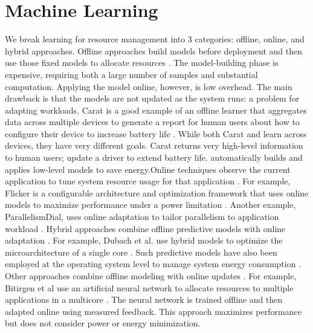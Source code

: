 \section{Machine Learning}
We break learning for resource management into 3 categories: offline,
online, and hybrid approaches. Offline  approaches build models
before deployment and then use those fixed models to allocate
resources
\cite{Yi2003,LeeBrooks2006,CPR,ChenJohn2011,petabricksStatic}.  The
model-building phase is expensive, requiring both a large number of
samples and substantial computation.  Applying the model online,
however, is low overhead.  The main drawback is that the models are
not updated as the system runs: a problem for adapting workloads.
  Carat is a good example of an
offline learner that aggregates data across multiple devices to
generate a report for human users about how to configure their device
to increase battery life \cite{carat}.  While both Carat and \SYSTEM{}
learn across devices, they have very different goals.  Carat returns
very high-level information to human users; \eg{} update a driver to
extend battery life.  \SYSTEM{} automatically builds and applies
low-level models to save energy.Online techniques observe the current application
to tune system resource usage for that application
\cite{Li2006,Flicker,ParallelismDial,Ponamarev,petabricksDynamic,LeeBrooks}.
For example, Flicker is a configurable architecture and optimization
framework that uses online models to maximize performance under a
power limitation \cite{Flicker}.  Another example, ParallelismDial,
uses online adaptation to tailor parallelism to application workload
\cite{ParallelismDial}. Hybrid  approaches combine offline
predictive models with online adaptation
\cite{Zhang2012,packandcap,Winter2010,dubach2010,Koala,Cinder,
  wu2012inferred}.  For example, Dubach et al.  use hybrid models to
optimize the microarchitecture of a single core \cite{dubach2010}.
Such predictive models have also been employed at the operating system
level to manage system energy consumption
\cite{Koala,Cinder,wu2012inferred}.  Other approaches combine offline
modeling with online updates \cite{JouleGuard, Bitirgen2008}.  For
example, Bitirgen et al use an artificial neural network to allocate
resources to multiple applications in a multicore \cite{Bitirgen2008}.
The neural network is trained offline and then adapted online using
measured feedback.  This approach maximizes performance but does not
consider power or energy minimization.

